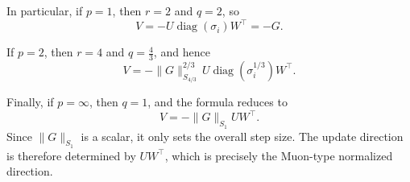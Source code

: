 \documentclass{article}
\theoremstyle{definition}
\begin{document}
In particular, if $p=1$, then $r=2$ and $q=2$, so
\[
V
=
-U\operatorname{diag}(\sigma_i)W^\top
=
-G.
\]

If $p=2$, then $r=4$ and $q=\frac43$, and hence
\[
V
=
-\|G\|_{S_{4/3}}^{2/3}\,
U\operatorname{diag}(\sigma_i^{1/3})W^\top.
\]

Finally, if $p=\infty$, then $q=1$, and the formula reduces to
\[
V
=
-\|G\|_{S_1}UW^\top.
\]
Since $\|G\|_{S_1}$ is a scalar, it only sets the overall step size. The update direction is therefore determined by $UW^\top$, which is precisely the Muon-type normalized direction.
  

\appendix
\end{document}
